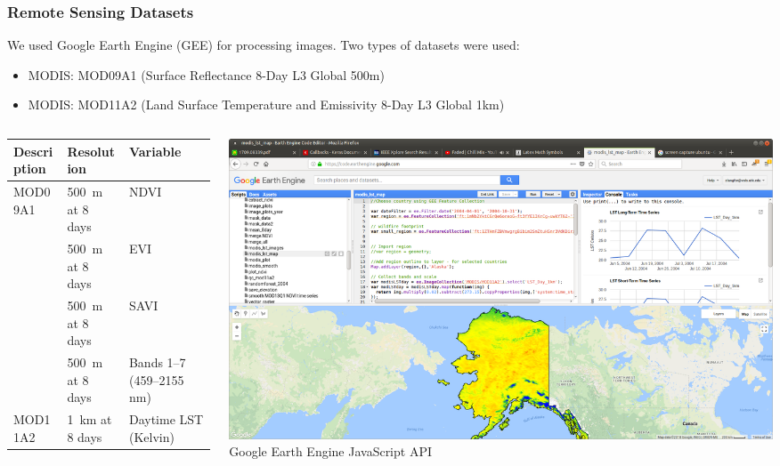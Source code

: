 \documentclass{beamer}
\begin{document}
\begin{frame}
  \frametitle{Remote Sensing Datasets}
  \vspace{-0.3cm}
\footnotesize
We used Google Earth Engine (GEE) for processing images. 
Two types of datasets were used:
\begin{itemize}
 \item MODIS: MOD09A1 (Surface Reflectance 8-Day L3 Global 500m)
  \item MODIS: MOD11A2 (Land Surface Temperature and Emissivity 8-Day L3 Global 1km)
\end{itemize}

\begin{columns}[T]
    \begin{column}{.4\textwidth}

  \tiny
        \begin{tabular}{p{10mm}p{10mm}p{15mm}} \toprule
        Description    & Resolution   & Variable \\ \midrule
        MOD09A1  

       & 500~m at 8 days & NDVI \\ \cmidrule(l){2-3}
       & 500~m at 8 days & EVI \\ \cmidrule(l){2-3}
       & 500~m at 8 days & SAVI \\ \cmidrule(l){2-3}

       & 500~m at 8 days & Bands 1--7 (459--2155 nm) \\ \cmidrule(l){1-3}
       MOD11A2
       & 1~km at 8 days & Daytime LST (Kelvin) \\ \cmidrule(l){1-3}
      
       
       \bottomrule
    \end{tabular}
    \end{column}
    \begin{column}{.6\textwidth}

     \centering
\includegraphics[width=1.0\textwidth]{figs/gee_ak.png}
\\

Google Earth Engine JavaScript API

    \end{column}
  \end{columns}
   
\end{frame}
\end{document}
